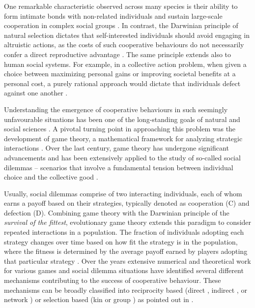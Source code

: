\documentclass[a4paper,pre,reqno,superscriptaddress,twocolumn, floatfix]{revtex4}
\begin{document}
One remarkable characteristic observed across many species is their ability to form intimate bonds with non-related individuals and sustain large-scale cooperation in complex social groups \cite{smith_logic_1973, nowak_supercooperators_2012, christakis_friendship_2014}. In contrast, the Darwinian principle of natural selection dictates that self-interested individuals should avoid engaging in altruistic actions, as the costs of such cooperative behaviours do not necessarily confer a direct reproductive advantage \cite{hardin_tragedy_1968, maynard_smith_evolution_1982, dawkins_selfish_2006}. The same principle extends also to human social systems. For example, in a collective action problem, when given a choice between maximizing personal gains or improving societal benefits at a personal cost, a purely rational approach would dictate that individuals defect against one another \cite{taylor_evolutionary_1978, hofbauer_evolutionary_1998}. 



Understanding the emergence of cooperative behaviours in such seemingly unfavourable situations has been one of the long-standing goals of natural and social sciences \cite{nowak_evolutionary_1992, szabo_evolutionary_1998}. A pivotal turning point in approaching this problem was the development of game theory, a mathematical framework for analyzing strategic interactions \cite{von1944theory, nash_equilibrium_1950, nowak_evolving_2012, broom_generalized_2019}. Over the last century, game theory has undergone significant advancements and has been extensively applied to the study of so-called social dilemmas -- scenarios that involve a fundamental tension between individual choice and the collective good \cite{axelrod_evolution_1981, axelrod_further_1988, sigmund_evolutionary_1999, nowak_evolutionary_2006, szabo_evolutionary_2007, perc_statistical_2017}. 


Usually, social dilemmas comprise of two interacting individuals, each of whom earns a payoff based on their strategies, typically denoted as cooperation (C) and defection (D). Combining game theory with the Darwinian principle of the \emph{survival of the fittest}, evolutionary game theory extends this paradigm to consider repeated interactions in a population. The fraction of individuals adopting each strategy changes over time based on how fit the strategy is in the population, where the fitness is determined by the average payoff earned by players adopting that particular strategy \cite{axelrod_evolution_1981, nowak_evolutionary_1992, hofbauer_evolutionary_1998, traulsen_future_2023}. Over the years extensive numerical and theoretical work for various games and social dilemma situations have identified several different mechanisms contributing to the success of cooperative behaviour. These mechanisms can be broadly classified into reciprocity based (direct \cite{trivers1971evolution, axelrod_evolution_1981}, indirect \cite{nowak1998evolution, hilbe2018indirect}, or network \cite{lieberman_evolutionary_2005, szabo_evolutionary_2007}) or selection based (kin \cite{hamilton1964genetical, taylor1992altruism} or group \cite{wilson1975theory, traulsen2006evolution}) as pointed out in \cite{nowak_five_2006}.
\end{document}
